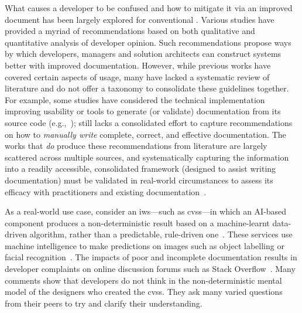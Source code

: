 What causes a developer to be confused and how to mitigate it via an improved  document has been largely explored for conventional . Various studies have provided a myriad of recommendations based on both qualitative and quantitative analysis of developer opinion. Such recommendations propose ways by which developers, managers and solution architects can construct systems better with improved documentation. However, while previous works have covered certain aspects of  usage, many have lacked a systematic review of literature and do not offer a taxonomy to consolidate these guidelines together. For example, some studies have considered the technical implementation improving  usability or tools to generate (or validate)  documentation from its source code (e.g.,~\citep{Nybom:2018ef,Watson:2012uy,Maalej2013}); still lacks a consolidated effort to capture recommendations on how to \textit{manually write} complete, correct, and effective  documentation. The works that \textit{do} produce these recommendations from literature are largely scattered across multiple sources, and systematically capturing the information into a readily accessible, consolidated framework (designed to assist writing  documentation) must be validated in real-world circumstances to assess its efficacy with practitioners and existing documentation~\citep{Cummaudo:2019esem}.

As a real-world use case, consider an \gls{iws}---such as \glspl{cvs}---in which an AI-based component produces a non-deterministic result based on a machine-learnt data-driven algorithm, rather than a predictable, rule-driven one~\citep{Cummaudo:2019icsme}. These services use machine intelligence to make predictions on images such as object labelling or facial recognition~. The impacts of poor and incomplete documentation results in developer complaints on online discussion forums such as Stack Overflow~\citep{Cummaudo:2020icse}. Many comments show that developers do not think in the non-deterministic mental model of the designers who created the \glspl{cvs}. They ask many varied questions from their peers to try and clarify their understanding.

